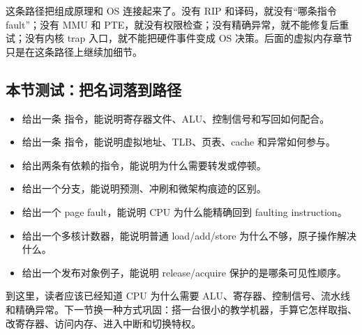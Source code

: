 这条路径把组成原理和 OS 连接起来了。没有 RIP 和译码，就没有“哪条指令 fault”；没有 MMU 和 PTE，就没有权限检查；没有精确异常，就不能修复后重试；没有内核 trap 入口，就不能把硬件事件变成 OS 决策。后面的虚拟内存章节只是在这条路径上继续加细节。

\subsection{本节测试：把名词落到路径}

\begin{rubricbox}
\begin{itemize}
\tightlist
\item 给出一条  指令，能说明寄存器文件、ALU、控制信号和写回如何配合。
\item 给出一条  指令，能说明虚拟地址、TLB、页表、cache 和异常如何参与。
\item 给出两条有依赖的指令，能说明为什么需要转发或停顿。
\item 给出一个分支，能说明预测、冲刷和微架构痕迹的区别。
\item 给出一个 page fault，能说明 CPU 为什么能精确回到 faulting instruction。
\item 给出一个多核计数器，能说明普通 load/add/store 为什么不够，原子操作解决什么。
\item 给出一个发布对象例子，能说明 release/acquire 保护的是哪条可见性顺序。
\end{itemize}
\end{rubricbox}

到这里，读者应该已经知道 CPU 为什么需要 ALU、寄存器、控制信号、流水线和精确异常。下一节换一种方式巩固：搭一台很小的教学机器，手算它怎样取指、改寄存器、访问内存、进入中断和切换特权。
